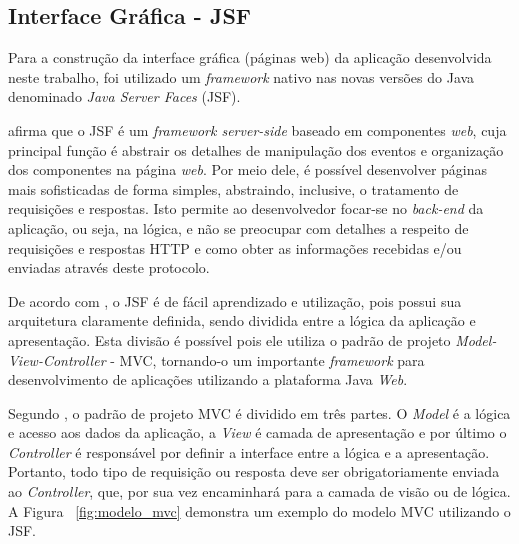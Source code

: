  

\subsection{Interface Gráfica - JSF}


\par Para a construção da interface gráfica (páginas web) da aplicação
desenvolvida neste trabalho, foi utilizado um \textit{framework} nativo nas
novas versões do Java denominado \textit{Java Server Faces} (JSF).

\par {} afirma que o JSF é um
\textit{framework server-side} baseado em componentes \textit{web}, cuja principal função é abstrair os detalhes de manipulação dos eventos e organização dos componentes na página \textit{web}. 
Por meio dele, é possível desenvolver páginas mais sofisticadas de forma
simples, abstraindo, inclusive, o tratamento de requisições e respostas. Isto permite ao desenvolvedor focar-se no \textit{back-end} da aplicação, ou seja, na lógica, e não se preocupar com detalhes a respeito de requisições e respostas HTTP e como obter as informações recebidas e/ou enviadas através deste protocolo.

\par De acordo com , o
JSF é de fácil aprendizado e utilização, pois possui sua arquitetura claramente definida, sendo dividida entre a lógica da aplicação e apresentação. Esta divisão é possível pois ele utiliza o padrão de projeto \textit{Model-View-Controller} - MVC\footnotemark[3], tornando-o um importante \textit{framework} para desenvolvimento de aplicações utilizando a plataforma Java \textit{Web}.


\par Segundo
, 
o padrão de projeto MVC é dividido em três partes. O \textit{Model} é a lógica e
acesso aos dados da aplicação, a \textit{View} é camada de apresentação e por
último o \textit{Controller} é responsável por definir a interface entre a lógica e a apresentação. Portanto, todo tipo de requisição ou resposta deve ser obrigatoriamente enviada 
ao \textit{Controller}, que, por sua vez encaminhará para a camada de visão ou
de lógica. A Figura ~\ref{fig:modelo_mvc} demonstra um exemplo do modelo MVC
utilizando o JSF.

